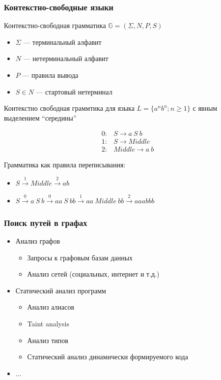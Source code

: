 \documentclass[xcolor=table]{beamer}
\begin{document}
\begin{frame}[fragile]
  \transwipe[direction=90]
  \frametitle{Контекстно-свободные языки}
Контекстно-свободная грамматика $\mathbb{G}=(\Sigma,N,P,S)$ 
  \begin{itemize}
      \item $\Sigma$ --- терминальный алфавит
      \item $N$ --- нетерминальный алфавит
      \item $P$ --- правила вывода
      \item $S \in N$ --- стартовый нетерминал
  \end{itemize}

Контекстно свободная граммтика для языка $L=\{a^n b^n; n \geq 1\}$ с явным выделением ``середины'' \\
\begin{center}
   \[
\begin{array}{rl} 
   0:& S \rightarrow a \ S \ b \\
   1:& S \rightarrow Middle \\
   2:& Middle \rightarrow a \ b
\end{array}
\]
\end{center}

Грамматика как правила переписывания:
 
    \begin{itemize}
        \item $S \xrightarrow{1} Middle \xrightarrow{2} ab$
        \item $S \xrightarrow{0} a\ S\ b \xrightarrow{0} aa\ S\ bb \xrightarrow{1} aa\ Middle\ bb \xrightarrow{2} aaabbb$
    \end{itemize}

\end{frame}


\begin{frame}[fragile]
  \transwipe[direction=90]
  \frametitle{Поиск путей в графах}
  \begin{itemize}
  \item Анализ графов
    \begin{itemize}
        \item Запросы к графовым базам данных
        \item Анализ сетей (социальных, интернет и т.д.)
    \end{itemize}
  \item Статический анализ программ
      \begin{itemize}
        \item Анализ алиасов
        \item Taint analysis
        \item Анализ типов
        \item Статический анализ динамически формируемого кода
      \end{itemize}
   \item ...
  \end{itemize}
\end{frame}
\end{document}

